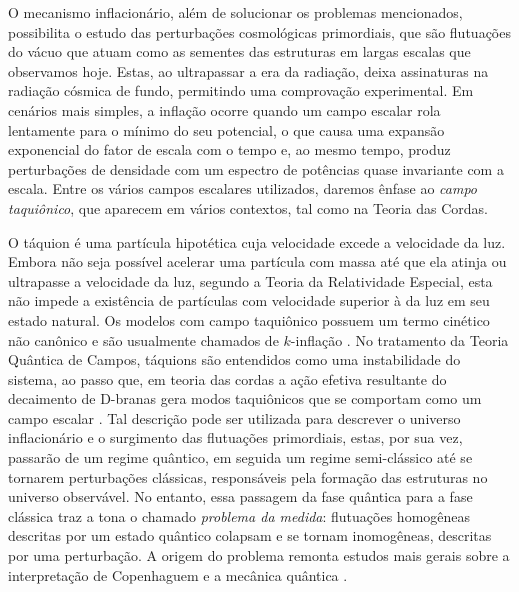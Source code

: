 \documentclass[
	12pt,				%
	openright,			%
	oneside,			%
	a4paper,			%
	english,			%
	french,				%
	spanish,			%
	brazil				%
	]{abntex2}
\begin{document}
O mecanismo inflacionário, além de solucionar os problemas mencionados, possibilita o estudo das perturbações 
cosmológicas primordiais, que são flutuações do vácuo que atuam como as sementes das estruturas em largas escalas
 que observamos hoje. Estas, ao ultrapassar a era da radiação, deixa assinaturas na radiação cósmica de fundo, permitindo 
 uma comprovação experimental. Em cenários mais simples, a inflação ocorre quando um campo escalar rola lentamente para 
 o mínimo do seu potencial, o que causa uma expansão exponencial do fator de escala com o tempo e, ao mesmo tempo, produz 
 perturbações de densidade com um espectro de potências quase invariante com a escala. Entre os vários campos escalares 
 utilizados, daremos ênfase ao \emph{campo taquiônico}, que aparecem em vários contextos, tal como na Teoria das Cordas.
 
O táquion é uma partícula hipotética cuja velocidade excede a velocidade da luz. Embora não seja possível acelerar uma partícula
  com massa até que ela atinja ou ultrapasse a velocidade da luz, segundo a Teoria da Relatividade Especial,
   esta não impede a existência de partículas com velocidade superior à da luz em seu estado natural. Os modelos com campo taquiônico possuem um termo cinético não canônico e são usualmente chamados de $k$-inflação \cite{ARMENDARIZPICON}. No tratamento da Teoria Quântica de Campos, 
 táquions são entendidos como uma instabilidade do sistema, ao passo que, em teoria das cordas a ação efetiva resultante do 
 decaimento de D-branas gera modos taquiônicos que se comportam como um campo escalar \cite{Sen_2002,PhysRevD.62.126003}. Tal descrição pode ser utilizada para descrever o universo inflacionário e o surgimento das flutuações primordiais, estas, por sua vez, passarão de um regime quântico, em seguida um regime semi-clássico até se tornarem perturbações clássicas, responsáveis pela formação das estruturas no universo observável. No entanto, essa passagem da fase quântica para a fase clássica traz a tona o chamado \emph{problema da medida}: flutuações homogêneas descritas por um estado quântico colapsam e se tornam inomogêneas, descritas por uma perturbação. A origem do problema remonta estudos mais gerais sobre a interpretação de Copenhaguem e a mecânica quântica \cite{RevModPhys.75.715,Kristian,Peierls_1991}. 
 
\end{document}
